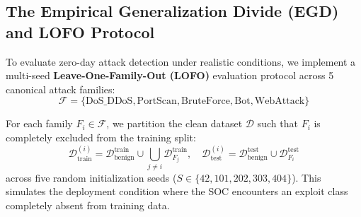 \documentclass[conference,10pt,twocolumn]{IEEEtran}
\begin{document}
\begin{table}[!t]
\centering
\caption{Transport Feature Taxonomy and Physical Protocol Coupling Invariants}
\label{tab:taxonomy}
\setlength{\tabcolsep}{3pt}
\end{table}

\subsection{The Empirical Generalization Divide (EGD) and LOFO Protocol}
To evaluate zero-day attack detection under realistic conditions, we implement a multi-seed \textbf{Leave-One-Family-Out (LOFO)} evaluation protocol across 5 canonical attack families:
\begin{equation}
\mathcal{F} = \{\text{DoS\_DDoS}, \text{PortScan}, \text{BruteForce}, \text{Bot}, \text{WebAttack}\}
\end{equation}

For each family $F_i \in \mathcal{F}$, we partition the clean dataset $\mathcal{D}$ such that $F_i$ is completely excluded from the training split:
\begin{equation}
\mathcal{D}_{\text{train}}^{(i)} = \mathcal{D}_{\text{benign}}^{\text{train}} \cup \bigcup_{j \ne i} \mathcal{D}_{F_j}^{\text{train}}, \quad \mathcal{D}_{\text{test}}^{(i)} = \mathcal{D}_{\text{benign}}^{\text{test}} \cup \mathcal{D}_{F_i}^{\text{test}}
\end{equation}
across five random initialization seeds ($S \in \{42, 101, 202, 303, 404\}$). This simulates the deployment condition where the SOC encounters an exploit class completely absent from training data.
\end{document}

